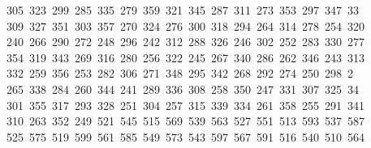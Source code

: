 \begin{tabbing}
\ 305\ 323\ 299\ 285\ 335\ 279\ 359\ 321\ 345\ 287\ 311\ 273\ 353\ 297\ 347\ 33\\[0pt]
\ 309\ 327\ 351\ 303\ 357\ 270\ 324\ 276\ 300\ 318\ 294\ 264\ 314\ 278\ 254\ 320\\[0pt]
\>\ 240\ 266\ 290\ 272\ 248\ 296\ 242\ 312\ 288\ 326\ 246\ 302\ 252\ 283\ 330\ 277\\[0pt]
\>\ 354\ 319\ 343\ 269\ 316\ 280\ 256\ 322\ 245\ 267\ 340\ 286\ 262\ 346\ 243\ 313\ \\[0pt]
\ 332\ 259\ 356\ 253\ 282\ 306\ 271\ 348\ 295\ 342\ 268\ 292\ 274\ 250\ 298\ 2\\[0pt]
\ 265\ 338\ 284\ 260\ 344\ 241\ 289\ 336\ 308\ 258\ 350\ 247\ 331\ 307\ 325\ 34\\[0pt]
\ 301\ 355\ 317\ 293\ 328\ 251\ 304\ 257\ 315\ 339\ 334\ 261\ 358\ 255\ 291\ 341\\[0pt]
\>\ 310\ 263\ 352\ 249\ 521\ 545\ 515\ 569\ 539\ 563\ 527\ 551\ 513\ 593\ 537\ 587\\[0pt]
\>\ 525\ 575\ 519\ 599\ 561\ 585\ 549\ 573\ 543\ 597\ 567\ 591\ 516\ 540\ 510\ 564\ \\[0pt]

\end{tabbing}
